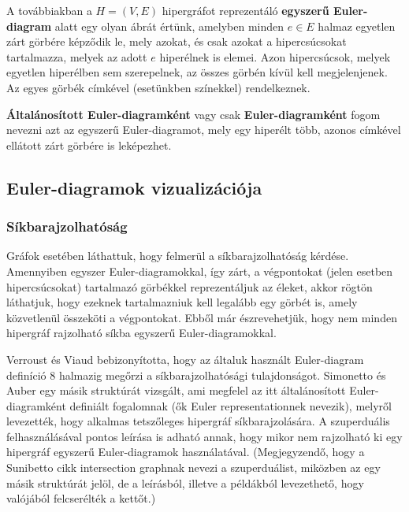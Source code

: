 \begin{definition}
A továbbiakban a $H=(V,E)$ hipergráfot reprezentáló \textbf{egyszerű Euler-diagram} alatt egy olyan ábrát értünk, amelyben minden $e \in E$ halmaz egyetlen zárt görbére képződik le, mely azokat, és csak azokat a hipercsúcsokat tartalmazza, melyek az adott $e$ hiperélnek is elemei. Azon hipercsúcsok, melyek egyetlen hiperélben sem szerepelnek, az összes görbén kívül kell megjelenjenek. Az egyes görbék címkével (esetünkben színekkel) rendelkeznek.
\end{definition}


\begin{definition}
\textbf{Általánosított Euler-diagramként} vagy csak \textbf{Euler-diagramként} fogom nevezni azt az egyszerű Euler-diagramot, mely egy hiperélt több, azonos címkével ellátott zárt görbére is leképezhet.
\end{definition}


\subsection{Euler-diagramok vizualizációja}

\subsubsection{Síkbarajzolhatóság}

Gráfok esetében láthattuk, hogy felmerül a síkbarajzolhatóság kérdése. Amennyiben egyszer Euler-diagramokkal, így zárt, a végpontokat (jelen esetben hipercsúcsokat) tartalmazó görbékkel reprezentáljuk az éleket, akkor rögtön láthatjuk, hogy ezeknek tartalmazniuk kell legalább egy görbét is, amely közvetlenül összeköti a végpontokat. Ebből már észrevehetjük, hogy nem minden hipergráf rajzolható síkba egyszerű Euler-diagramokkal.


Verroust és Viaud bebizonyította\cite{drawability_8_sets}, hogy az általuk használt Euler-diagram definíció 8 halmazig megőrzi a síkbarajzolhatósági tulajdonságot. Simonetto és Auber egy másik struktúrát vizsgált\cite{simonetto_undrawable}, ami megfelel az itt általánosított Euler-diagramként definiált fogalomnak (ők Euler representationnek nevezik), melyről levezették, hogy alkalmas tetszőleges hipergráf síkbarajzolására. A szuperduális felhasználásával pontos leírása is adható annak, hogy mikor nem rajzolható ki egy hipergráf egyszerű Euler-diagramok használatával\cite{drawability_8_sets, simonetto_undrawable}. (Megjegyzendő, hogy a Sunibetto cikk intersection graphnak nevezi a szuperduálist, miközben az egy másik struktúrát jelöl, de a leírásból, illetve a példákból levezethető, hogy valójából felcserélték a kettőt.)

